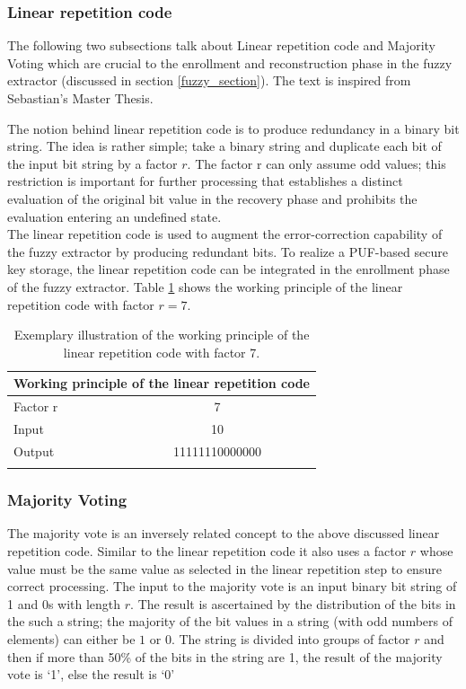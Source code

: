 \subsubsection{Linear repetition code}
\label{fzex_lr}
The following two subsections talk about Linear repetition code and Majority Voting which are crucial to the enrollment and reconstruction phase in the fuzzy extractor (discussed in section \ref{fuzzy_section}). The text is inspired from Sebastian's Master Thesis.\cite{71}

The notion behind linear repetition code is to produce redundancy in a binary bit string. The idea is rather simple; take a binary string and duplicate each bit of the input bit string by a factor $r$. The factor r can only assume odd values; this restriction is important for further processing that establishes a distinct evaluation of the original bit value in the recovery phase and prohibits the evaluation entering an undefined state.\\

The linear repetition code is used to augment the error-correction capability of the fuzzy extractor by producing redundant bits. To realize a PUF-based secure key storage, the linear repetition code can be integrated in the enrollment phase of the fuzzy extractor. Table \ref{lr} shows the working principle of the linear repetition code with factor $r = 7$.

\begin{table}[!ht]
\begin{center}
\begin{tabular}{lc}
\toprule
\multicolumn{2}{c}{\textbf{Working principle of the linear repetition code}}\\
\midrule
Factor r & 7\\
Input & 10\\
Output & 11111110000000\\
\addlinespace
\bottomrule
\end{tabular}
\end{center}
\caption{Exemplary illustration of the working principle of the linear repetition code with factor 7.}
\label{lr}
\end{table}

\subsubsection{Majority Voting}
\label{fzex_mv}
The majority vote is an inversely related concept to the above discussed linear repetition code. Similar to the linear repetition code it also uses a factor $r$ whose value must be the same value as selected in the linear repetition step to ensure correct processing. The input to the majority vote is an input binary bit string of 1 and 0s with length $r$. The result is ascertained by the distribution of the bits in the such a string; the majority of the bit values in a string (with odd numbers of elements) can either be $1$ or $0$. The string is divided into groups of factor $r$ and then if more than 50\% of the bits in the string are 1, the result of the majority vote is `1', else the result is `0'\\

